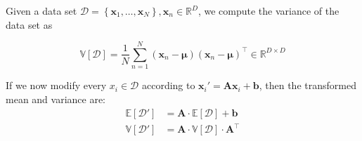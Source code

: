 \documentclass[10pt,a4paper]{Template}
\begin{document}
\thispagestyle{empty}


\begin{minipage}{0.48\textwidth}



Given a data set $\mathcal{D}=\left\{\boldsymbol{x}_{1}, \ldots, \boldsymbol{x}_{N}\right\}, \boldsymbol{x}_{n} \in \mathbb{R}^{D}$, we compute the variance of the data set as

\[
\mathbb{V}[\mathcal{D}]=\frac{1}{N} \sum_{n=1}^{N}\left(\boldsymbol{x}_{n}-\boldsymbol{\mu}\right)\left(\boldsymbol{x}_{n}-\boldsymbol{\mu}\right)^{\top} \in \mathbb{R}^{D \times D}
\]

\divider

If we now modify every $x_{i} \in \mathcal{D}$ according to $\boldsymbol{x}_i' = \boldsymbol{A}\boldsymbol{x}_i + \boldsymbol{b}$, then the transformed mean and variance are:
\[
\begin{aligned}
    \mathbb{E}[\mathcal{D'}] & = \boldsymbol{A} \cdot \mathbb{E}[\mathcal{D}] + \boldsymbol{b} \\
    \mathbb{V}[\mathcal{D'}] & = \boldsymbol{A} \cdot \mathbb{V}[\mathcal{D}] \cdot \boldsymbol{A}^{\top}
\end{aligned}
\]

\vspace{0.5cm}




\end{minipage}
\end{document}
